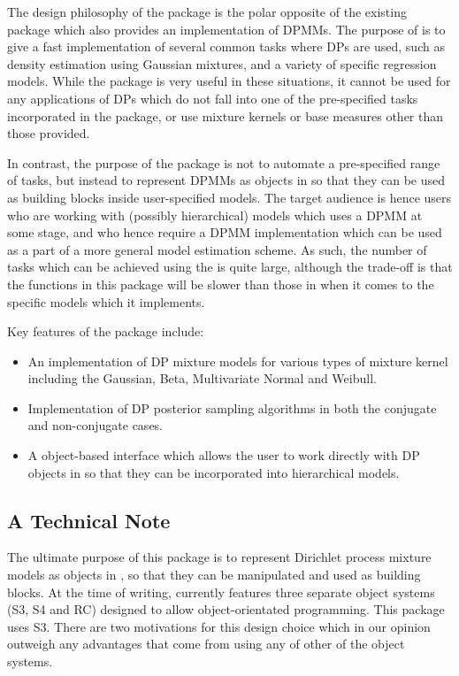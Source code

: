\documentclass[nojss]{jss}
\begin{document}
The design philosophy of the  package is the polar opposite of the existing    package which also provides an implementation of DPMMs. The purpose of  is to give a fast implementation of several common tasks where DPs are used, such as density estimation using Gaussian mixtures, and a variety of specific regression models. While the  package is very useful in these situations, it cannot be used for any applications of DPs which do not fall into one of the pre-specified tasks incorporated in the package, or use mixture kernels or base measures other than those provided.

In contrast, the purpose of the  package is not to automate a pre-specified range of tasks, but instead to represent DPMMs as objects in  so that they can be used as building blocks inside user-specified  models. The target audience is hence users who are working with  (possibly hierarchical) models which uses a DPMM at some stage, and who hence require a DPMM implementation which can be used as a part of a more general model estimation scheme.  As such, the number of tasks which can be achieved using the  is quite large, although the trade-off is that the functions in this package will be slower than those in  when it comes to the specific models which it implements.

Key features of the  package include:
\begin{itemize}
\item An implementation of DP mixture models for various types of mixture kernel including the Gaussian, Beta, Multivariate Normal and Weibull.
\item Implementation of DP posterior sampling algorithms in both the conjugate and non-conjugate cases.
\item A object-based interface which allows the user to work directly with DP objects in  so that they can be incorporated into hierarchical models.
\end{itemize}

\subsection{A Technical Note}
The ultimate purpose of this package is to represent Dirichlet process mixture models as objects in , so that they can be manipulated and used as building blocks. At the time of writing,  currently features three separate object systems (S3, S4 and RC) designed to allow object-orientated programming. This package uses S3. There are two motivations for this design choice which in our opinion outweigh any advantages that come from using any of other of the  object systems.
\end{document}
